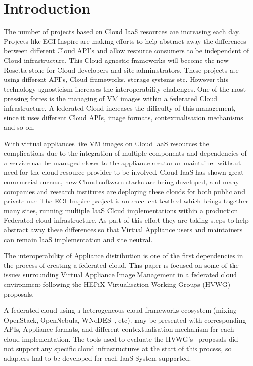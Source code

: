\documentclass{cai}
\begin{document}
\section{Introduction}
\label{sect-introduction}
The number of projects based on Cloud IaaS resources are increasing each day. Projects like EGI-Inspire are making efforts to help abstract away the differences between different Cloud API's and allow resource consumers to be independent of Cloud infrastructure.
This Cloud agnostic frameworks will become the new Rosetta stone for Cloud developers and site administrators. These projects are using different API's, Cloud frameworks, storage systems etc. 
However this technology agnosticism increases the interoperability challenges. One of the most pressing forces is the managing of VM images within a federated Cloud infrastructure.
A federated Cloud increases the difficulty of this management, since it uses different Cloud APIs, image formats, contextualisation mechanisms and so on. 

With virtual appliances like VM images on Cloud IaaS resources the complications due to the integration of multiple components and dependencies of a service can be managed closer to the appliance creator or maintainer without need for the cloud resource provider to be involved. 
Cloud IaaS has shown great commercial success, new Cloud software stacks are being developed, and many companies and research institutes are deploying these clouds for both public and private use. 
The EGI-Inspire project is an excellent testbed which brings together many sites, running multiple IaaS Cloud implementations within a production Federated cloud infrastructure. As part of this effort they are taking steps to help abstract away these differences so that Virtual Appliance users and maintainers can remain IaaS implementation and site neutral.

The interoperability of Appliance distribution is one of the first dependencies in the process of creating a federated cloud. This paper is focused on some of the issues surrounding Virtual Appliance Image Management in a federated cloud environment following the HEPiX Virtualisation Working Groups (HVWG)~\cite{hepix} proposals.

A federated cloud using a heterogeneous cloud frameworks ecosystem (mixing OpenStack, OpenNebula, WNoDES~\cite{wnodes}, etc). may be presented with corresponding APIs, Appliance formats, and different contextualisation mechanism for each cloud implementation. 
The tools used to evaluate the HVWG's~\cite{hepix} proposals did not support any specific cloud infrastructures at the start of this process, so adapters had to be developed for each IaaS System supported. 
\end{document}

